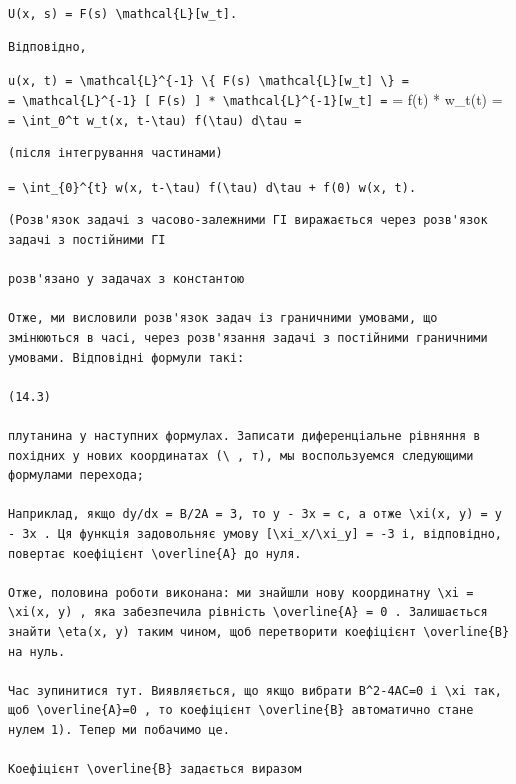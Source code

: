 \documentclass[
  ukrainian,
]{article}
\begin{document}
\texttt{U(x,\ s)\ =\ F(s)\ \textbackslash{}mathcal\{L\}{[}w\_t{]}.}

\begin{verbatim}
Відповідно,
\end{verbatim}

\texttt{u(x,\ t)\ =\ \textbackslash{}mathcal\{L\}\^{}\{-1\}\ \textbackslash{}\{\ F(s)\ \textbackslash{}mathcal\{L\}{[}w\_t{]}\ \textbackslash{}\}\ =}
\texttt{=\ \textbackslash{}mathcal\{L\}\^{}\{-1\}\ {[}\ F(s)\ {]}\ *\ \textbackslash{}mathcal\{L\}\^{}\{-1\}{[}w\_t{]}\ =}
= f(t) * w\_t(t) =
\texttt{=\ \textbackslash{}int\_0\^{}t\ w\_t(x,\ t-\textbackslash{}tau)\ f(\textbackslash{}tau)\ d\textbackslash{}tau\ =}

\begin{verbatim}
(після інтегрування частинами)
\end{verbatim}

\texttt{=\ \textbackslash{}int\_\{0\}\^{}\{t\}\ w(x,\ t-\textbackslash{}tau)\ f\textquotesingle{}(\textbackslash{}tau)\ d\textbackslash{}tau\ +\ f(0)\ w(x,\ t).}

\begin{verbatim}
(Розв'язок задачі з часово-залежними ГІ виражається через розв'язок задачі з постійними ГІ

розв'язано у задачах з константою

Отже, ми висловили розв'язок задач із граничними умовами, що змінюються в часі, через розв'язання задачі з постійними граничними умовами. Відповідні формули такі:

(14.3)

плутанина у наступних формулах. Записати диференціальне рівняння в похідних у нових координатах (\ , т), мы воспользуемся следующими формулами перехода;

Наприклад, якщо dy/dx = B/2A = 3, то y - 3x = c, а отже \xi(x, y) = y - 3x . Ця функція задовольняє умову [\xi_x/\xi_y] = -3 і, відповідно, повертає коефіцієнт \overline{A} до нуля.

Отже, половина роботи виконана: ми знайшли нову координатну \xi = \xi(x, y) , яка забезпечила рівність \overline{A} = 0 . Залишається знайти \eta(x, y) таким чином, щоб перетворити коефіцієнт \overline{B} на нуль.

Час зупинитися тут. Виявляється, що якщо вибрати B^2-4AC=0 і \xi так, щоб \overline{A}=0 , то коефіцієнт \overline{B} автоматично стане нулем 1). Тепер ми побачимо це.

Коефіцієнт \overline{B} задається виразом
\end{verbatim}
\end{document}
